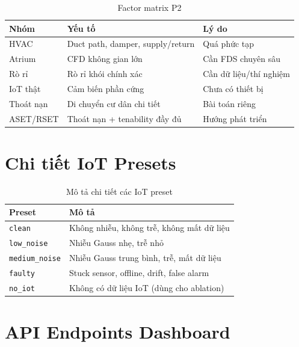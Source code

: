 \begin{appendices}
\begin{table}[H]
\centering
\caption{Factor matrix P2}
\label{tab:factorP2}
\begin{tabularx}{\textwidth}{l l X}
\toprule
\textbf{Nhóm} & \textbf{Yếu tố} & \textbf{Lý do} \\
\midrule
HVAC      & Duct path, damper, supply/return & Quá phức tạp \\
Atrium    & CFD không gian lớn              & Cần FDS chuyên sâu \\
Rò rỉ     & Rò rỉ khói chính xác            & Cần dữ liệu/thí nghiệm \\
IoT thật  & Cảm biến phần cứng              & Chưa có thiết bị \\
Thoát nạn & Di chuyển cư dân chi tiết       & Bài toán riêng \\
ASET/RSET & Thoát nạn + tenability đầy đủ  & Hướng phát triển \\
\bottomrule
\end{tabularx}
\end{table}


\chapter{Chi tiết IoT Presets}
\label{app:iotpresets}

\begin{table}[H]
\centering
\caption{Mô tả chi tiết các IoT preset}
\label{tab:iotpresets_detail}
\begin{tabularx}{\textwidth}{l X}
\toprule
\textbf{Preset} & \textbf{Mô tả} \\
\midrule
\texttt{clean}        & Không nhiễu, không trễ, không mất dữ liệu \\
\texttt{low\_noise}    & Nhiễu Gauss nhẹ, trễ nhỏ \\
\texttt{medium\_noise} & Nhiễu Gauss trung bình, trễ, mất dữ liệu \\
\texttt{faulty}        & Stuck sensor, offline, drift, false alarm \\
\texttt{no\_iot}       & Không có dữ liệu IoT (dùng cho ablation) \\
\bottomrule
\end{tabularx}
\end{table}


\chapter{API Endpoints Dashboard}
\label{app:api}


\end{appendices}
